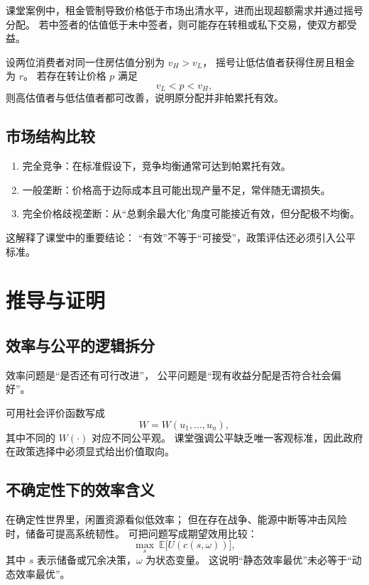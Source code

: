 \documentclass[UTF8,11pt,a4paper]{ctexart}
\newcommand{\E}{\mathbb{E}}
\begin{document}
课堂案例中，租金管制导致价格低于市场出清水平，进而出现超额需求并通过摇号分配。
若中签者的估值低于未中签者，则可能存在转租或私下交易，使双方都受益。

设两位消费者对同一住房估值分别为 $v_H>v_L$，
摇号让低估值者获得住房且租金为 $r$。
若存在转让价格 $p$ 满足
\begin{equation}
  v_L < p < v_H,
\end{equation}
则高估值者与低估值者都可改善，说明原分配并非帕累托有效。

\subsection{市场结构比较}

\begin{enumerate}
  \item 完全竞争：在标准假设下，竞争均衡通常可达到帕累托有效。
  \item 一般垄断：价格高于边际成本且可能出现产量不足，常伴随无谓损失。
  \item 完全价格歧视垄断：从“总剩余最大化”角度可能接近有效，但分配极不均衡。
\end{enumerate}

这解释了课堂中的重要结论：
“有效”不等于“可接受”，政策评估还必须引入公平标准。

\section{推导与证明}

\subsection{效率与公平的逻辑拆分}

效率问题是“是否还有可行改进”，
公平问题是“现有收益分配是否符合社会偏好”。

可用社会评价函数写成
\begin{equation}
  W = W(u_1,\dots,u_n),
\end{equation}
其中不同的 $W(\cdot)$ 对应不同公平观。
课堂强调公平缺乏唯一客观标准，因此政府在政策选择中必须显式给出价值取向。

\subsection{不确定性下的效率含义}

在确定性世界里，闲置资源看似低效率；
但在存在战争、能源中断等冲击风险时，储备可提高系统韧性。
可把问题写成期望效用比较：
\begin{equation}
  \max_{s} \ \E\big[U(c(s,\omega))\big],
\end{equation}
其中 $s$ 表示储备或冗余决策，$\omega$ 为状态变量。
这说明“静态效率最优”未必等于“动态效率最优”。
\end{document}
